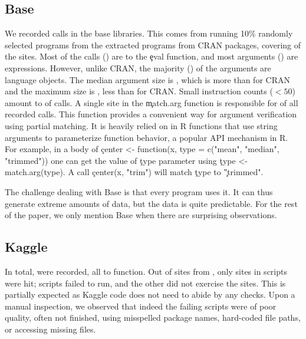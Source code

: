 \documentclass[review,screen,acmsmall,anonymous=true]{acmart}
\begin{document}
\subsection{Base}\label{sec:usage-base}

We recorded \baseAllcalls \eval calls in the \BasePackages base libraries. This
comes from running 10\% randomly selected programs from the
\CranRunnableScriptsRnd extracted programs from CRAN packages, covering
\baseTriggeredevalpct of the \BaseEvalCallSites sites. Most of the calls
(\baseEvalsratio) are to the \c{eval} function, and most arguments
(\baseCodepercent) are expressions. However, unlike CRAN, the majority
(\baseLanguagepercent) of the arguments are language objects. The median
argument size is \baseMedianszeval, which is more than for CRAN and the maximum size is \baseMaxszeval, less than for CRAN. Small instruction counts ($<50$) amount to \baseSmalleventspct of calls. A single site in the \c{match.arg}
function is responsible for \baseTopFuncPercent of all recorded calls. This
function provides a convenient way for argument verification using partial
matching. It is heavily relied on in R functions that use string arguments to
parameterize function behavior, a popular API mechanism in R. For example, in a
body of \c{center <- function(x, type = c("mean", "median", "trimmed"))} one
can get the value of \c{type} parameter using \c{type <- match.arg(type)}. A
call \c{center(x, "trim")} will match \c{type} to \c{"trimmed"}.

The challenge dealing with Base is that every program uses it. It can thus
generate extreme amounts of data, but the data is quite predictable. For the
rest of the paper, we only mention Base when there are surprising
observations.

\medskip

\subsection{Kaggle}

In total, \kaggleAllcalls \eval were recorded, all to \eval function. Out of
\kaggleStaticeval sites from \KaggleWithEvals, only \kaggleTriggeredeval sites
in \kaggleNbruns scripts were hit; \KaggleFailedScripts scripts failed to run,
and the other did not exercise the \eval sites. This is partially expected
as Kaggle code does not need to abide by any checks. Upon a manual inspection,
we observed that indeed the failing scripts were of poor quality, often not
finished, using misspelled package names, hard-coded file paths, or accessing
missing files.
\end{document}
